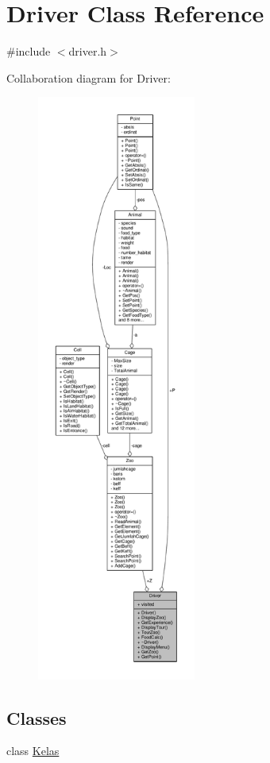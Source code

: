 \hypertarget{classDriver}{}\section{Driver Class Reference}
\label{classDriver}


{\ttfamily \#include $<$driver.\+h$>$}



Collaboration diagram for Driver\+:
\nopagebreak
\begin{figure}[H]
\begin{center}
\leavevmode
\includegraphics[height=550pt]{classDriver__coll__graph}
\end{center}
\end{figure}
\subsection*{Classes}
\begin{DoxyCompactItemize}
\item 
class \hyperlink{classDriver_1_1Kelas}{Kelas}
\end{DoxyCompactItemize}
